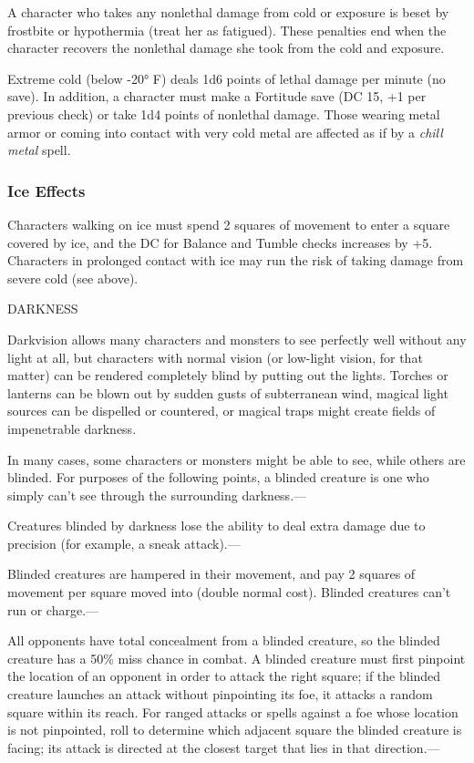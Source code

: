 \documentclass{article}
\begin{document}
A character who takes any nonlethal damage from cold or exposure is beset by frostbite 
or hypothermia (treat her as fatigued). These penalties end when the character 
recovers the nonlethal damage she took from the cold and exposure.

Extreme cold (below -20° F) deals 1d6 points of lethal damage per minute (no save). 
In addition, a character must make a Fortitude save (DC 15, +1 per previous check) 
or take 1d4 points of nonlethal damage. Those wearing metal armor or coming into 
contact with very cold metal are affected as if by a \textit{chill metal }spell.

\subsubsection*{\textbf{Ice Effects}}

Characters walking on ice must spend 2 squares of movement to enter a square covered 
by ice, and the DC for Balance and Tumble checks increases by +5. Characters in 
prolonged contact with ice may run the risk of taking damage from severe cold (see 
above).

\vspace{12pt}
DARKNESS

Darkvision allows many characters and monsters to see perfectly well without any 
light at all, but characters with normal vision (or low-light vision, for that 
matter) can be rendered completely blind by putting out the lights. Torches or 
lanterns can be blown out by sudden gusts of subterranean wind, magical light sources 
can be dispelled or countered, or magical traps might create fields of impenetrable 
darkness.

In many cases, some characters or monsters might be able to see, while others are 
blinded. For purposes of the following points, a blinded creature is one who simply 
can't see through the surrounding darkness.---

Creatures blinded by darkness lose the ability to deal extra damage due to precision 
(for example, a sneak attack).---

Blinded creatures are hampered in their movement, and pay 2 squares of movement 
per square moved into (double normal cost). Blinded creatures can't run or charge.---

All opponents have total concealment from a blinded creature, so the blinded creature 
has a 50\% miss chance in combat. A blinded creature must first pinpoint the location 
of an opponent in order to attack the right square; if the blinded creature launches 
an attack without pinpointing its foe, it attacks a random square within its reach. 
For ranged attacks or spells against a foe whose location is not pinpointed, roll 
to determine which adjacent square the blinded creature is facing; its attack is 
directed at the closest target that lies in that direction.---
\end{document}
